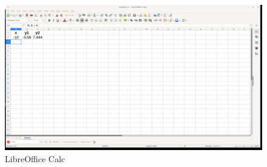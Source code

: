 \begin{figure}[h!]		
	\centering
   	\includegraphics[width=8.0in]{pictures/picture_007.png}
  	\caption{LibreOffice Calc}
   	\label{fig:LibreOfficeCalc007}
\end{figure}